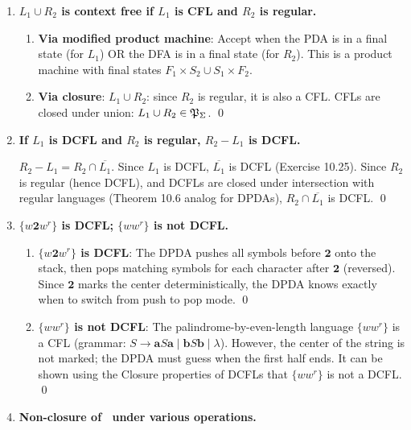 \begin{enumerate}[{10.}1. ]
\item \textbf{$L_1\cup R_2$ is context free if $L_1$ is CFL and $R_2$ is regular.}

\begin{enumerate}
\item \textbf{Via modified product machine}: Accept when the PDA is in a final state (for $L_1$) OR the DFA is in a final state (for $R_2$). This is a product machine with final states $F_1 \times S_2 \cup S_1 \times F_2$.

\item \textbf{Via closure}: $L_1 \cup R_2$: since $R_2$ is regular, it is also a CFL. CFLs are closed under union: $L_1 \cup R_2 \in \mathfrak{P}_\Sigma$. \qed
\end{enumerate}

\item \textbf{If $L_1$ is DCFL and $R_2$ is regular, $R_2 - L_1$ is DCFL.}

$R_2 - L_1 = R_2 \cap \overline{L_1}$. Since $L_1$ is DCFL, $\overline{L_1}$ is DCFL (Exercise 10.25). Since $R_2$ is regular (hence DCFL), and DCFLs are closed under intersection with regular languages (Theorem 10.6 analog for DPDAs), $R_2 \cap \overline{L_1}$ is DCFL. \qed

\item \textbf{$\{w\pmb{2}w^r\}$ is DCFL; $\{ww^r\}$ is not DCFL.}

\begin{enumerate}
\item \textbf{$\{w\pmb{2}w^r\}$ is DCFL}: The DPDA pushes all symbols before $\pmb{2}$ onto the stack, then pops matching symbols for each character after $\pmb{2}$ (reversed). Since $\pmb{2}$ marks the center deterministically, the DPDA knows exactly when to switch from push to pop mode. \qed

\item \textbf{$\{ww^r\}$ is not DCFL}: The palindrome-by-even-length language $\{ww^r\}$ is a CFL (grammar: $S\to\pmb{a}S\pmb{a}\mid\pmb{b}S\pmb{b}\mid\lambda$). However, the center of the string is not marked; the DPDA must guess when the first half ends. It can be shown using the Closure properties of DCFLs that $\{ww^r\}$ is not a DCFL. \qed
\end{enumerate}

\item \textbf{Non-closure of \ASIG\ under various operations.}


\end{enumerate}
